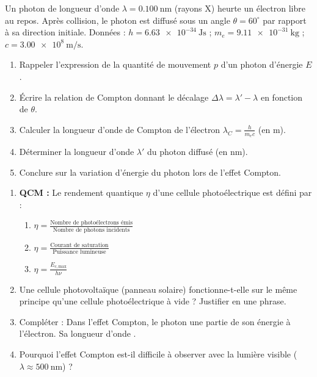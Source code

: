 \documentclass[11pt]{article}
\begin{document}
\begin{exercice}
Un photon de longueur d'onde $\lambda = \SI{0,100}{\nano\meter}$ (rayons X) heurte un électron libre au repos. Après collision, le photon est diffusé sous un angle $\theta = 60^\circ$ par rapport à sa direction initiale.
Données : $h = \SI{6,63e-34}{\joule\second}$ ; $m_e = \SI{9,11e-31}{\kilogram}$ ; $c = \SI{3,00e8}{\meter\per\second}$.
\begin{enumerate}
    \item Rappeler l'expression de la quantité de mouvement $p$ d'un photon d'énergie $E$.
    \item Écrire la relation de Compton donnant le décalage $\Delta\lambda = \lambda' - \lambda$ en fonction de $\theta$.
    \item Calculer la longueur d'onde de Compton de l'électron $\lambda_C = \frac{h}{m_e c}$ (en $\text{m}$).
    \item Déterminer la longueur d'onde $\lambda'$ du photon diffusé (en $\text{nm}$).
    \item Conclure sur la variation d'énergie du photon lors de l'effet Compton.
\end{enumerate}
\end{exercice}

\begin{exercice}
\begin{enumerate}
    \item \textbf{QCM :} Le rendement quantique $\eta$ d'une cellule photoélectrique est défini par :
    \begin{enumerate}
        \item $\eta = \frac{\text{Nombre de photoélectrons émis}}{\text{Nombre de photons incidents}}$
        \item $\eta = \frac{\text{Courant de saturation}}{\text{Puissance lumineuse}}$
        \item $\eta = \frac{E_{c,\text{max}}}{h\nu}$
    \end{enumerate}
    \item Une cellule photovoltaïque (panneau solaire) fonctionne-t-elle sur le même principe qu'une cellule photoélectrique à vide ? Justifier en une phrase.
    \item Compléter : Dans l'effet Compton, le photon \underline{\hspace{3cm}} une partie de son énergie à l'électron. Sa longueur d'onde \underline{\hspace{3cm}}.
    \item Pourquoi l'effet Compton est-il difficile à observer avec la lumière visible ($\lambda \approx \SI{500}{\nano\meter}$) ?
\end{enumerate}
\end{exercice}
\end{document}
